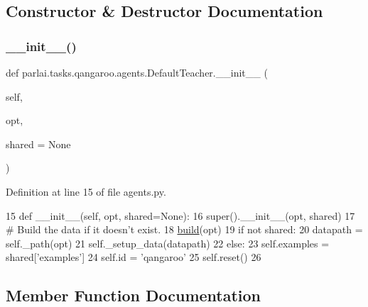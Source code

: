 \subsection{Constructor \& Destructor Documentation}
\mbox{\label{classparlai_1_1tasks_1_1qangaroo_1_1agents_1_1DefaultTeacher_aa46ac201bb6d53bc9333a97cbe4d3b41}} 
\subsubsection{\texorpdfstring{\+\_\+\+\_\+init\+\_\+\+\_\+()}{\_\_init\_\_()}}
{\footnotesize\ttfamily def parlai.\+tasks.\+qangaroo.\+agents.\+Default\+Teacher.\+\_\+\+\_\+init\+\_\+\+\_\+ (\begin{DoxyParamCaption}\item[{}]{self,  }\item[{}]{opt,  }\item[{}]{shared = {\ttfamily None} }\end{DoxyParamCaption})}



Definition at line 15 of file agents.\+py.


\begin{DoxyCode}
15     \textcolor{keyword}{def }\_\_init\_\_(self, opt, shared=None):
16         super().\_\_init\_\_(opt, shared)
17         \textcolor{comment}{# Build the data if it doesn't exist.}
18         \hyperlink{namespaceparlai_1_1mturk_1_1tasks_1_1talkthewalk_1_1download_a8c0fbb9b6dfe127cb8c1bd6e7c4e33fd}{build}(opt)
19         \textcolor{keywordflow}{if} \textcolor{keywordflow}{not} shared:
20             datapath = self.\_path(opt)
21             self.\_setup\_data(datapath)
22         \textcolor{keywordflow}{else}:
23             self.examples = shared[\textcolor{stringliteral}{'examples'}]
24         self.id = \textcolor{stringliteral}{'qangaroo'}
25         self.reset()
26 
\end{DoxyCode}


\subsection{Member Function Documentation}
\mbox{\label{classparlai_1_1tasks_1_1qangaroo_1_1agents_1_1DefaultTeacher_a02b79b33e67868bc575b65e26de38d51}} 
